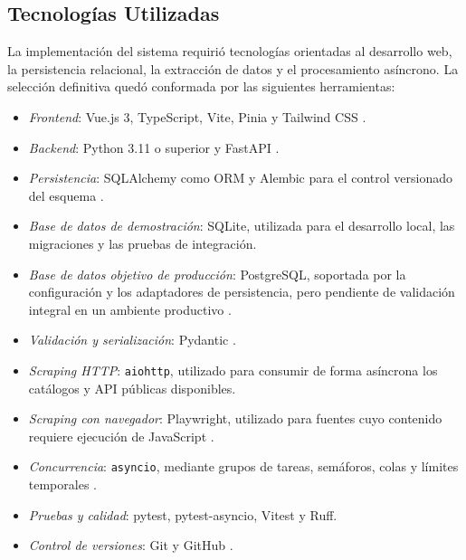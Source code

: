 
\subsection{Tecnologías Utilizadas}

La implementación del sistema requirió tecnologías orientadas al desarrollo
web, la persistencia relacional, la extracción de datos y el procesamiento
asíncrono. La selección definitiva quedó conformada por las siguientes
herramientas:

\begin{itemize}
    \item \textit{Frontend}: Vue.js 3, TypeScript, Vite, Pinia y Tailwind CSS
    \cite{vuejs}.
    \item \textit{Backend}: Python 3.11 o superior y FastAPI
    \cite{pythondocs,fastapi}.
    \item \textit{Persistencia}: SQLAlchemy como ORM y Alembic para el control
    versionado del esquema \cite{sqlalchemy}.
    \item \textit{Base de datos de demostración}: SQLite, utilizada para el
    desarrollo local, las migraciones y las pruebas de integración.
    \item \textit{Base de datos objetivo de producción}: PostgreSQL, soportada
    por la configuración y los adaptadores de persistencia, pero pendiente de
    validación integral en un ambiente productivo \cite{postgresdocs}.
    \item \textit{Validación y serialización}: Pydantic \cite{pydantic}.
    \item \textit{Scraping HTTP}: \texttt{aiohttp}, utilizado para consumir de
    forma asíncrona los catálogos y API públicas disponibles.
    \item \textit{Scraping con navegador}: Playwright, utilizado para fuentes
    cuyo contenido requiere ejecución de JavaScript \cite{playwright}.
    \item \textit{Concurrencia}: \texttt{asyncio}, mediante grupos de tareas,
    semáforos, colas y límites temporales \cite{pythondocs}.
    \item \textit{Pruebas y calidad}: pytest, pytest-asyncio, Vitest y Ruff.
    \item \textit{Control de versiones}: Git y GitHub \cite{github}.
\end{itemize}

